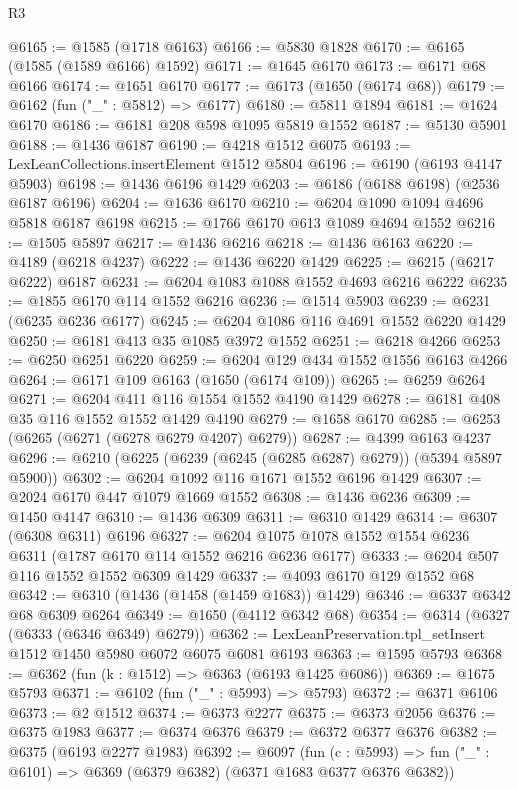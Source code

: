 \begin{lexlean}{R3}
\begin{coremodule}
@6165 := @1585 (@1718 @6163)
@6166 := @5830 @1828
@6170 := @6165 (@1585 (@1589 @6166) @1592)
@6171 := @1645 @6170
@6173 := @6171 @68 @6166
@6174 := @1651 @6170
@6177 := @6173 (@1650 (@6174 @68))
@6179 := @6162 (fun ("_" : @5812) => @6177)
@6180 := @5811 @1894
@6181 := @1624 @6170
@6186 := @6181 @208 @598 @1095 @5819 @1552
@6187 := @5130 @5901
@6188 := @1436 @6187
@6190 := @4218 @1512 @6075
@6193 := LexLeanCollections.insertElement @1512 @5804
@6196 := @6190 (@6193 @4147 @5903)
@6198 := @1436 @6196 @1429
@6203 := @6186 (@6188 @6198) (@2536 @6187 @6196)
@6204 := @1636 @6170
@6210 := @6204 @1090 @1094 @4696 @5818 @6187 @6198
@6215 := @1766 @6170 @613 @1089 @4694 @1552
@6216 := @1505 @5897
@6217 := @1436 @6216
@6218 := @1436 @6163
@6220 := @4189 (@6218 @4237)
@6222 := @1436 @6220 @1429
@6225 := @6215 (@6217 @6222) @6187
@6231 := @6204 @1083 @1088 @1552 @4693 @6216 @6222
@6235 := @1855 @6170 @114 @1552 @6216
@6236 := @1514 @5903
@6239 := @6231 (@6235 @6236 @6177)
@6245 := @6204 @1086 @116 @4691 @1552 @6220 @1429
@6250 := @6181 @413 @35 @1085 @3972 @1552
@6251 := @6218 @4266
@6253 := @6250 @6251 @6220
@6259 := @6204 @129 @434 @1552 @1556 @6163 @4266
@6264 := @6171 @109 @6163 (@1650 (@6174 @109))
@6265 := @6259 @6264
@6271 := @6204 @411 @116 @1554 @1552 @4190 @1429
@6278 := @6181 @408 @35 @116 @1552 @1552 @1429 @4190
@6279 := @1658 @6170
@6285 := @6253 (@6265 (@6271 (@6278 @6279 @4207) @6279))
@6287 := @4399 @6163 @4237
@6296 := @6210 (@6225 (@6239 (@6245 (@6285 @6287) @6279)) (@5394 @5897 @5900))
@6302 := @6204 @1092 @116 @1671 @1552 @6196 @1429
@6307 := @2024 @6170 @447 @1079 @1669 @1552
@6308 := @1436 @6236
@6309 := @1450 @4147
@6310 := @1436 @6309
@6311 := @6310 @1429
@6314 := @6307 (@6308 @6311) @6196
@6327 := @6204 @1075 @1078 @1552 @1554 @6236 @6311 (@1787 @6170 @114 @1552 @6216 @6236 @6177)
@6333 := @6204 @507 @116 @1552 @1552 @6309 @1429
@6337 := @4093 @6170 @129 @1552 @68
@6342 := @6310 (@1436 (@1458 (@1459 @1683)) @1429)
@6346 := @6337 @6342 @68 @6309 @6264
@6349 := @1650 (@4112 @6342 @68)
@6354 := @6314 (@6327 (@6333 (@6346 @6349) @6279))
@6362 := LexLeanPreservation.tpl_setInsert @1512 @1450 @5980 @6072 @6075 @6081 @6193
@6363 := @1595 @5793
@6368 := @6362 (fun (k : @1512) => @6363 (@6193 @1425 @6086))
@6369 := @1675 @5793
@6371 := @6102 (fun ("_" : @5993) => @5793)
@6372 := @6371 @6106
@6373 := @2 @1512
@6374 := @6373 @2277
@6375 := @6373 @2056
@6376 := @6375 @1983
@6377 := @6374 @6376
@6379 := @6372 @6377 @6376
@6382 := @6375 (@6193 @2277 @1983)
@6392 := @6097
    (fun (c : @5993) => fun ("_" : @6101) => @6369 (@6379 @6382) (@6371 @1683 @6377 @6376 @6382))

\end{coremodule}
\end{lexlean}

